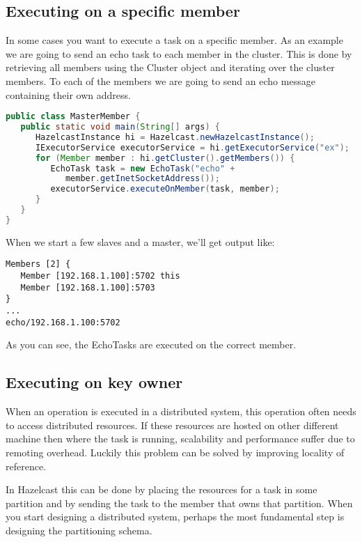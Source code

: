 \subsection{Executing on a specific member}
In some cases you want to execute a task on a specific member. As an example we are going to send an echo task to each member in the cluster. This is done by retrieving all members using the Cluster object and iterating over the cluster members. To each of the members we are going to send an echo message containing their own address. 
\begin{lstlisting}[language=java]
public class MasterMember {
   public static void main(String[] args) {
      HazelcastInstance hi = Hazelcast.newHazelcastInstance();
      IExecutorService executorService = hi.getExecutorService("ex");
      for (Member member : hi.getCluster().getMembers()) {
         EchoTask task = new EchoTask("echo" + 
            member.getInetSocketAddress());
         executorService.executeOnMember(task, member);
      }
   }
}
\end{lstlisting}
When we start a few slaves and a master, we'll get output like:
\begin{lstlisting}
Members [2] {
   Member [192.168.1.100]:5702 this
   Member [192.168.1.100]:5703
}
...
echo/192.168.1.100:5702
\end{lstlisting}
As you can see, the EchoTasks are executed on the correct member.

\subsection{Executing on key owner}
When an operation is executed in a distributed system, this operation often needs to access distributed resources. If these resources are hosted on other different machine then where the task is running, scalability and performance suffer due to remoting overhead. Luckily this problem can be solved by improving locality of reference.

In Hazelcast this can be done by placing the resources for a task in some partition and by sending the task to the member that owns that partition. When you start designing a distributed system, perhaps the most fundamental step is designing the partitioning schema.

